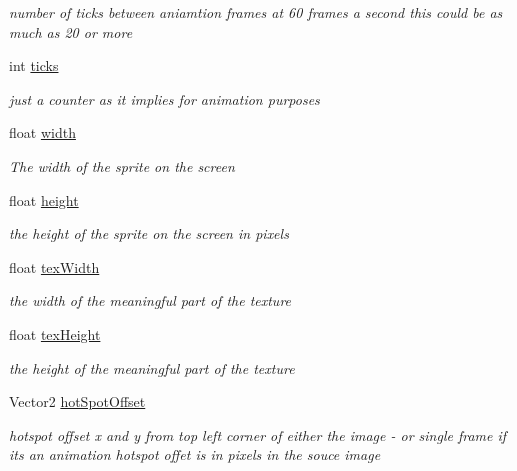 \begin{DoxyCompactItemize}
\begin{DoxyCompactList}\small\item\em number of ticks between aniamtion frames at 60 frames a second this could be as much as 20 or more \end{DoxyCompactList}\item 
int \mbox{\hyperlink{class_r_c___framework_1_1_sprite3_a59474528cccad4b750e2b72a5f8cf585}{ticks}}
\begin{DoxyCompactList}\small\item\em just a counter as it implies for animation purposes \end{DoxyCompactList}\item 
float \mbox{\hyperlink{class_r_c___framework_1_1_sprite3_adc96bdd58b49ea7f51c3e4a9f8167bc8}{width}}
\begin{DoxyCompactList}\small\item\em The width of the sprite on the screen \end{DoxyCompactList}\item 
float \mbox{\hyperlink{class_r_c___framework_1_1_sprite3_a3868e4ebe3d2ac0311fcf950650c5f91}{height}}
\begin{DoxyCompactList}\small\item\em the height of the sprite on the screen in pixels \end{DoxyCompactList}\item 
float \mbox{\hyperlink{class_r_c___framework_1_1_sprite3_a6155a73405919a9651d0d38e47dca233}{tex\+Width}}
\begin{DoxyCompactList}\small\item\em the width of the meaningful part of the texture \end{DoxyCompactList}\item 
float \mbox{\hyperlink{class_r_c___framework_1_1_sprite3_a66c1c4d6d47a86970961d4ba041acfce}{tex\+Height}}
\begin{DoxyCompactList}\small\item\em the height of the meaningful part of the texture \end{DoxyCompactList}\item 
Vector2 \mbox{\hyperlink{class_r_c___framework_1_1_sprite3_aeed4e50c73f6bc34f4b9a4dec34c2f8e}{hot\+Spot\+Offset}}
\begin{DoxyCompactList}\small\item\em hotspot offset x and y from top left corner of either the image -\/ or single frame if its an animation hotspot offet is in pixels in the souce image \end{DoxyCompactList}\end{DoxyCompactItemize}
